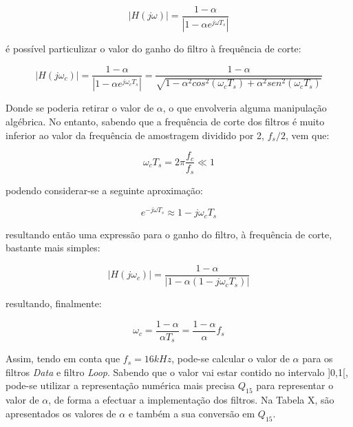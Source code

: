 \documentclass[11pt]{article}
\numberwithin{equation}{section}
\begin{document}
\vspace{-3mm}
\begin{equation}
	|H(j\omega)| = \frac{1-\alpha}{|1-\alpha e^{j\omega T_s}|}
\end{equation} 

é possível particulizar o valor do ganho do filtro à frequência de corte:

\vspace{-3mm}
\begin{equation}
	|H(j\omega_c)| = \frac{1-\alpha}{|1-\alpha e^{j\omega_c T_s}|} = \frac{1 - \alpha}{\sqrt{1- \alpha^2 cos^2{(\omega_c T_s)} + \alpha^2 sen^2{(\omega_c T_s)}}}
\end{equation} 

Donde se poderia retirar o valor de $\alpha$, o que envolveria alguma manipulação algébrica. No entanto, sabendo que a frequência de corte dos filtros é muito inferior ao valor da frequência de amostragem dividido por 2, $f_s/2$, vem que:

\vspace{-3mm}
\begin{equation}
\omega_ c T_s = 2\pi \frac{f_c}{f_s} \ll 1
\end{equation} 

podendo considerar-se a seguinte aproximação:

\vspace{-3mm}
\begin{equation}
e^{-j\omega T_s} \approx 1 - j\omega_c T_s
\end{equation} 

resultando então uma expressão para o ganho do filtro, à frequência de corte, bastante mais simples:

\vspace{-3mm}
\begin{equation}
|H(j\omega_c)| =  \frac{1 - \alpha}{|1-\alpha(1-j\omega_c T_s)|} 
\end{equation} 

resultando, finalmente:

\vspace{-3mm}
\begin{equation}
\omega_c = \frac{1 - \alpha}{\alpha T_s} = \frac{1 - \alpha}{\alpha} f_s
\end{equation} 

Assim, tendo em conta que $f_s = 16 kHz$, pode-se calcular o valor de $\alpha$ para os filtros \textit{Data} e filtro \textit{Loop}. Sabendo que o valor vai estar contido no intervalo ]0,1[, pode-se utilizar a representação numérica mais precisa $Q_15$ para representar o valor de $\alpha$, de forma a efectuar a implementação dos filtros. Na Tabela X, são apresentados os valores de $\alpha$ e também a sua conversão em $Q_15$.
\end{document}
